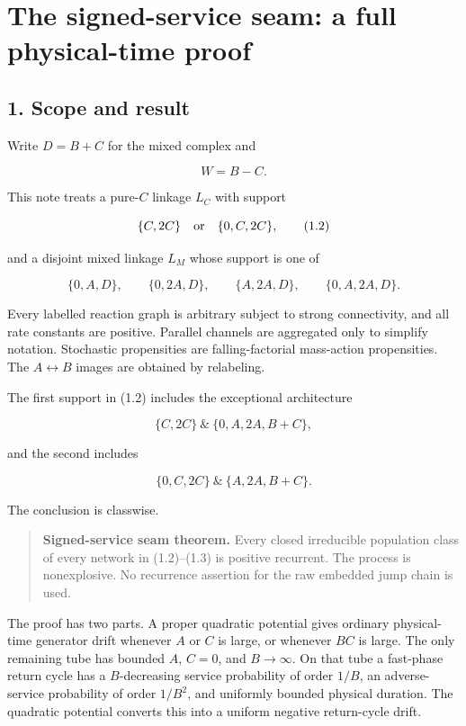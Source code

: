 \section{The signed-service seam: a full physical-time
proof}

\subsection{1. Scope and result}

Write \(D=B+C\) for the mixed complex and

\[
 W=B-C.
\tag{1.1}
\]

This note treats a pure-\(C\) linkage \(L_C\) with support

\[
 \{C,2C\}
 \quad\hbox{or}\quad
 \{0,C,2C\},
\tag{1.2}
\]

and a disjoint mixed linkage \(L_M\) whose support is one of

\[
 \{0,A,D\},\qquad
 \{0,2A,D\},\qquad
 \{A,2A,D\},\qquad
 \{0,A,2A,D\}.
\tag{1.3}
\]

Every labelled reaction graph is arbitrary subject to strong
connectivity, and all rate constants are positive. Parallel channels are
aggregated only to simplify notation. Stochastic propensities are
falling-factorial mass-action propensities. The \(A\leftrightarrow B\)
images are obtained by relabeling.

The first support in (1.2) includes the exceptional architecture

\[
 \{C,2C\}\ \&\ \{0,A,2A,B+C\},
\tag{1.4}
\]

and the second includes

\[
 \{0,C,2C\}\ \&\ \{A,2A,B+C\}.
\tag{1.5}
\]

The conclusion is classwise.

\begin{quote}
\textbf{Signed-service seam theorem.} Every closed irreducible
population class of every network in (1.2)--(1.3) is positive recurrent.
The process is nonexplosive. No recurrence assertion for the raw
embedded jump chain is used.
\end{quote}

The proof has two parts. A proper quadratic potential gives ordinary
physical-time generator drift whenever \(A\) or \(C\) is large, or
whenever \(BC\) is large. The only remaining tube has bounded \(A\),
\(C=0\), and \(B\to\infty\). On that tube a fast-phase return cycle has
a \(B\)-decreasing service probability of order \(1/B\), an
adverse-service probability of order \(1/B^2\), and uniformly bounded
physical duration. The quadratic potential converts this into a uniform
negative return-cycle drift.

